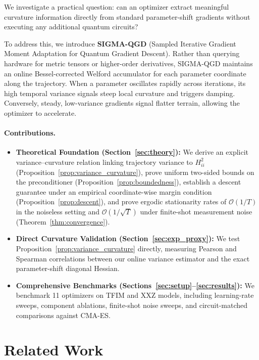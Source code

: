 \documentclass[sn-mathphys,Numbered]{sn-jnl}
\theoremstyle{thmstyleone}
\theoremstyle{thmstyletwo}
\theoremstyle{thmstylethree}
\begin{document}
We investigate a practical question: can an optimizer extract meaningful curvature information directly from standard parameter-shift gradients without executing any additional quantum circuits?

To address this, we introduce \textbf{SIGMA-QGD} (Sampled Iterative Gradient Moment Adaptation for Quantum Gradient Descent). Rather than querying hardware for metric tensors or higher-order derivatives, SIGMA-QGD maintains an online Bessel-corrected Welford accumulator \cite{welford1962note} for each parameter coordinate along the trajectory. When a parameter oscillates rapidly across iterations, its high temporal variance signals steep local curvature and triggers damping. Conversely, steady, low-variance gradients signal flatter terrain, allowing the optimizer to accelerate.

\paragraph{Contributions.}
\begin{itemize}
    \item \textbf{Theoretical Foundation (Section~\ref{sec:theory}):} We derive an explicit variance--curvature relation linking trajectory variance to $H_{ii}^2$ (Proposition~\ref{prop:variance_curvature}), prove uniform two-sided bounds on the preconditioner (Proposition~\ref{prop:boundedness}), establish a descent guarantee under an empirical coordinate-wise margin condition (Proposition~\ref{prop:descent}), and prove ergodic stationarity rates of $\mathcal{O}(1/T)$ in the noiseless setting and $\mathcal{O}(1/\sqrt{T})$ under finite-shot measurement noise (Theorem~\ref{thm:convergence}).
    \item \textbf{Direct Curvature Validation (Section~\ref{sec:exp_proxy}):} We test Proposition~\ref{prop:variance_curvature} directly, measuring Pearson and Spearman correlations between our online variance estimator and the exact parameter-shift diagonal Hessian.
    \item \textbf{Comprehensive Benchmarks (Sections~\ref{sec:setup}--\ref{sec:results}):} We benchmark 11 optimizers on TFIM and XXZ models, including learning-rate sweeps, component ablations, finite-shot noise sweeps, and circuit-matched comparisons against CMA-ES.
\end{itemize}

\section{Related Work}
\label{sec:related}
\end{document}
